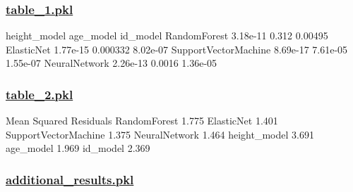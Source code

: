 \documentclass[11pt]{article}
\begin{document}
\subsubsection*{\hyperlink{code-Data Analysis-table-1-pkl}{table\_1.pkl}}

\begin{codeoutput}
                     height\_model age\_model  id\_model
RandomForest             3.18e-11     0.312   0.00495
ElasticNet               1.77e-15  0.000332  8.02e-07
SupportVectorMachine     8.69e-17  7.61e-05  1.55e-07
NeuralNetwork            2.26e-13    0.0016  1.36e-05
\end{codeoutput}\hypertarget{file-table-2-pkl}{}

\subsubsection*{\hyperlink{code-Data Analysis-table-2-pkl}{table\_2.pkl}}

\begin{codeoutput}
                      Mean Squared Residuals
RandomForest                           1.775
ElasticNet                             1.401
SupportVectorMachine                   1.375
NeuralNetwork                          1.464
height\_model                           3.691
age\_model                              1.969
id\_model                               2.369
\end{codeoutput}\hypertarget{file-additional-results-pkl}{}

\subsubsection*{\hyperlink{code-Data Analysis-additional-results-pkl}{additional\_results.pkl}}
\end{document}
